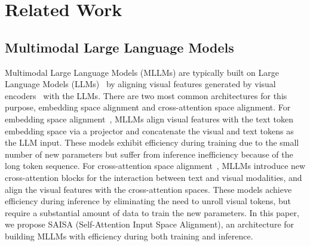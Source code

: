 \section{Related Work}

\subsection{Multimodal Large Language Models}
Multimodal Large Language Models (MLLMs) are typically built on Large Language Models (LLMs)~\cite{vicuna, llama3v, jiang2023mistral7b, touvron2023llamaopenefficientfoundation, touvron2023llama2openfoundation, bai2023qwentechnicalreport} by aligning visual features generated by visual encoders~\cite{radford2021learningtransferablevisualmodels, zhai2023sigmoidlosslanguageimage, ilharco_gabriel_2021_5143773, liu2022convnet2020s} with the LLMs.
There are two most common architectures for this purpose, embedding space alignment and cross-attention space alignment.
For embedding space alignment~\cite{liu2023visualinstructiontuning, liu2024improvedbaselinesvisualinstruction, li2023blip2bootstrappinglanguageimagepretraining, dai2023instructblipgeneralpurposevisionlanguagemodels, Qwen-VL, chen2023minigptv2largelanguagemodel, zhu2023minigpt4enhancingvisionlanguageunderstanding}, MLLMs align visual features with the text token embedding space via a projector and concatenate the visual and text tokens as the LLM input.
These models exhibit efficiency during training due to the small number of new parameters but suffer from inference inefficiency because of the long token sequence.
For cross-attention space alignment~\cite{alayrac2022flamingovisuallanguagemodel, OpenFlamingov2, awadalla2023openflamingoopensourceframeworktraining}, MLLMs introduce new cross-attention blocks for the interaction between text and visual modalities, and align the visual features with the cross-attention spaces.
These models achieve efficiency during inference by eliminating the need to unroll visual tokens, but require a substantial amount of data to train the new parameters.
In this paper, we propose SAISA (Self-Attention Input Space Alignment), an architecture for building MLLMs with efficiency during both training and inference.

